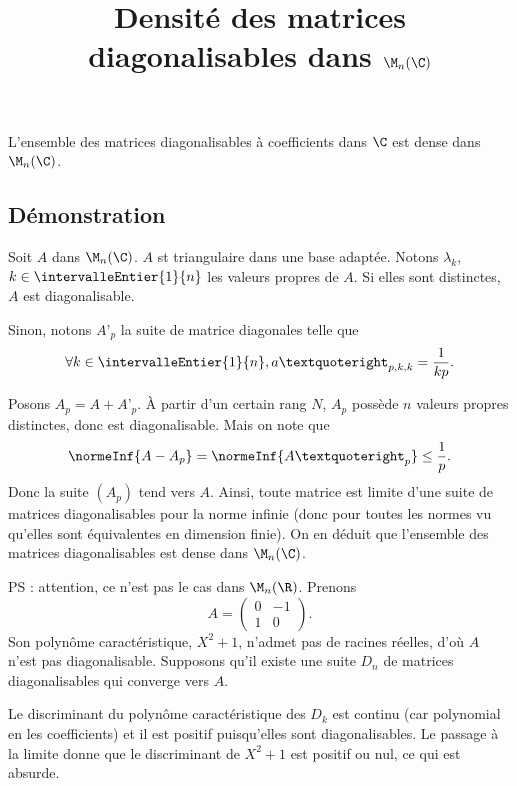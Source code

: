 \documentclass[fontsize=12pt,twoside=false,parskip=half, french]{scrartcl}
\title{Densité des matrices diagonalisables dans $\M_n(\C)$}
\date{}
\author{}
\begin{document}
\maketitle
   \begin{Theoreme}
      L’ensemble des matrices diagonalisables à coefficients dans $\C$ est dense
      dans $\M_n(\C)$.
   \end{Theoreme}
   \subsection{Démonstration}
      Soit $A$ dans $\M_n(\C)$. $A$ st triangulaire dans une base adaptée. Notons
      $\lambda_k$, $k \in \intervalleEntier{1}{n}$ les valeurs propres de $A$.
      Si elles sont distinctes, $A$ est diagonalisable.
      
      Sinon, notons $A’_{p}$ la suite de matrice diagonales telle que 
      \[
         \forall k \in \intervalleEntier{1}{n}, a’_{p, k, k} = \frac{1}{kp}.
      \]
      
      Posons $A_p = A + A’_p$. À partir d’un certain rang $N$, $A_p$ possède 
      $n$ valeurs propres distinctes, donc est diagonalisable. Mais on note que
      \[
         \normeInf{A - A_p} = \normeInf{A’_p} \leq \frac{1}{p}. 
      \]
      Donc la suite $(A_p)$ tend vers $A$. Ainsi, toute matrice est limite d’une
      suite de matrices diagonalisables pour la norme infinie (donc pour toutes 
      les normes vu qu’elles sont équivalentes en dimension finie). On en déduit
      que l’ensemble des matrices diagonalisables est dense dans $\M_n(\C)$.
      
      PS : attention, ce n’est pas le cas dans $\M_n(\R)$. Prenons
      \[
         A = \begin{pmatrix} 0 & -1 \\ 1 & 0 \end{pmatrix}. 
      \]
      Son polynôme caractéristique, $X^2 + 1$, n’admet pas de racines réelles, 
      d’où $A$ n’est pas diagonalisable. Supposons qu’il existe une suite $D_n$ 
      de matrices diagonalisables qui converge vers $A$. 
      
      Le discriminant du polynôme caractéristique des $D_k$ est continu (car  
      polynomial en les coefficients) et il est positif puisqu’elles sont 
      diagonalisables. Le passage à la limite donne que le discriminant de 
      $X^2 + 1$ est positif ou nul, ce qui est absurde.       
\end{document}
